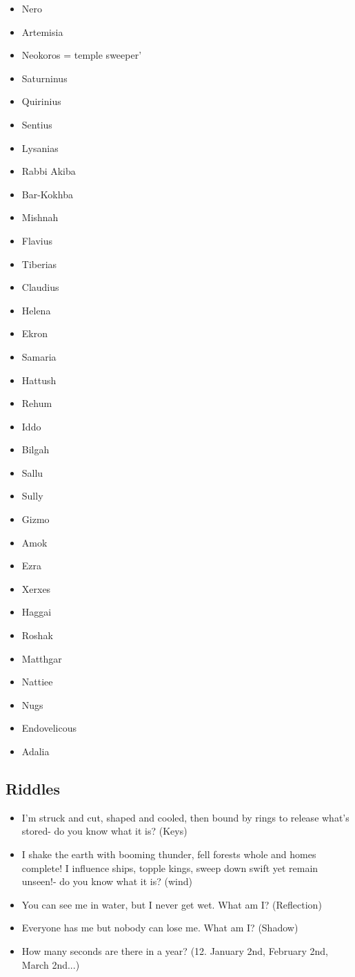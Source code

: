 \begin{multicols}{4}
	\begin{itemize}
		\item Nero
		\item Artemisia
		\item Neokoros = temple sweeper'
		\item Saturninus
		\item Quirinius
		\item Sentius
		\item Lysanias
		\item Rabbi Akiba
		\item Bar-Kokhba
		\item Mishnah
		\item Flavius
		\item Tiberias
		\item Claudius
		\item Helena
		\item Ekron
		\item Samaria
		\item Hattush
		\item Rehum
		\item Iddo
		\item Bilgah
		\item Sallu
		\item Sully
		\item Gizmo
		\item Amok
		\item Ezra
		\item Xerxes
		\item Haggai
		\item Roshak
		\item Matthgar
		\item Nattiee
		\item Nugs
		\item Endovelicous
		\item Adalia
	\end{itemize}
\end{multicols}

\subsection{Riddles}

\begin{itemize}
	\item I'm struck and cut, shaped and cooled, then bound by rings to release what's stored- do you know what it is? (Keys)
	
	\item I shake the earth with booming thunder, fell forests whole and homes complete! I influence ships, topple kings, sweep down swift yet remain unseen!- do you know what it is? (wind)
	
	\item You can see me in water, but I never get wet. What am I? (Reflection)
	
	\item Everyone has me but nobody can lose me. What am I? (Shadow)
	
	\item How many seconds are there in a year? (12. January 2nd, February 2nd, March 2nd...)
\end{itemize}